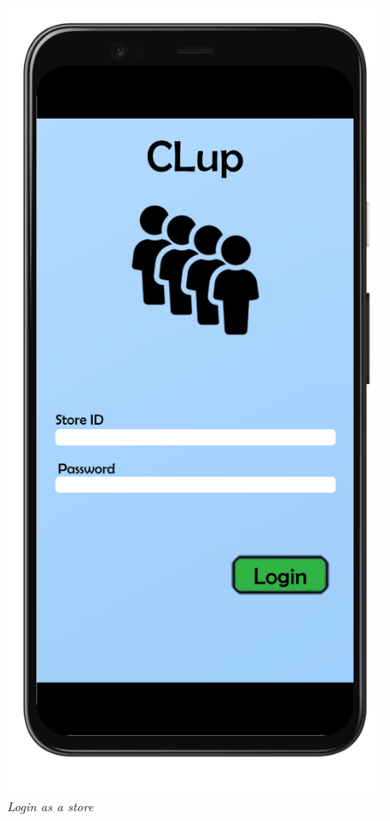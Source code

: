 \documentclass{article}
\begin{document}
\begin{figure}[!h]
			\hfill
			\begin{minipage}[!h]{0.4\textwidth}
				\includegraphics[width=\textwidth]{../Mockups/LoginStore.png}
				\caption{\emph{Login as a store}}
			\end{minipage}
		\end{figure}	
	
\end{document}
